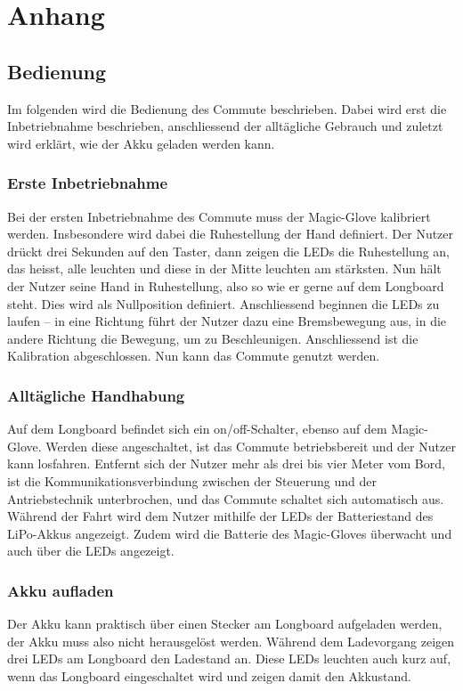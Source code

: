 \chapter{Anhang}\label{chp:Anhang}




\section{Bedienung}
Im folgenden wird die Bedienung des Commute beschrieben. Dabei wird erst die Inbetriebnahme beschrieben, anschliessend der alltägliche Gebrauch und zuletzt wird erklärt, wie der Akku geladen werden kann.
\subsection*{Erste Inbetriebnahme}
Bei der ersten Inbetriebnahme des Commute muss der Magic-Glove kalibriert werden. Insbesondere wird dabei die Ruhestellung der Hand definiert. Der Nutzer drückt drei Sekunden auf den Taster, dann zeigen die LEDs die Ruhestellung an, das heisst, alle leuchten und diese in der Mitte leuchten am stärksten. Nun hält der Nutzer seine Hand in Ruhestellung, also so wie er gerne auf dem Longboard steht. Dies wird als Nullposition definiert. Anschliessend beginnen die LEDs zu laufen – in eine Richtung führt der Nutzer dazu eine Bremsbewegung aus, in die andere Richtung die Bewegung, um zu Beschleunigen. Anschliessend ist die Kalibration abgeschlossen. Nun kann das Commute genutzt werden.
\subsection*{Alltägliche Handhabung}
Auf dem Longboard befindet sich ein on/off-Schalter, ebenso auf dem Magic-Glove. Werden diese angeschaltet, ist das Commute betriebsbereit und der Nutzer kann losfahren. 
Entfernt sich der Nutzer mehr als drei bis vier Meter vom Bord, ist die Kommunikationsverbindung zwischen der Steuerung und der Antriebstechnik unterbrochen, und das Commute schaltet sich automatisch aus. Während der Fahrt wird dem Nutzer mithilfe der LEDs der Batteriestand des LiPo-Akkus angezeigt. Zudem wird die Batterie des Magic-Gloves überwacht und auch über die LEDs angezeigt. 
\subsection*{Akku aufladen}
Der Akku kann praktisch über einen Stecker am Longboard aufgeladen werden, der Akku muss also nicht herausgelöst werden. Während dem Ladevorgang zeigen drei LEDs am Longboard den Ladestand an. Diese LEDs leuchten auch kurz auf, wenn das Longboard eingeschaltet wird und zeigen damit den Akkustand. 

